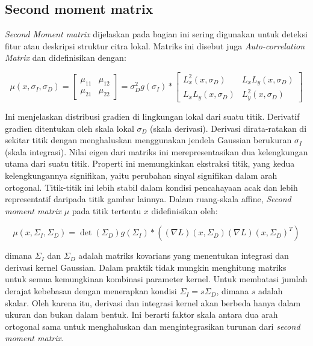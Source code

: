 \subsection{\textbf{Second moment matrix}}

\emph{Second Moment matrix} dijelaskan pada bagian ini sering digunakan untuk deteksi 
fitur atau deskripsi struktur citra lokal. Matriks ini disebut juga \emph{Auto-correlation Matrix} 
dan didefinisikan dengan:

\begin{equation}
  \mu(x,\sigma_{I},\sigma_{D})= 
  \begin{bmatrix}
   \mu_{11} & \mu_{12} \\
   \mu_{21} & \mu_{22} 
   \end{bmatrix} =
   \sigma^{2}_{D}g(\sigma_{I}) *
   \begin{bmatrix}
   L^{2}_{x}(x,\sigma_{D}) & L_{x}L_{y}(x,\sigma_{D}) \\
   L_{x}L_{y}(x,\sigma_{D}) & L^{2}_{y}(x,\sigma_{D}) 
   \end{bmatrix}
\end{equation}

Ini menjelaskan distribusi gradien di lingkungan lokal dari suatu titik. Derivatif gradien ditentukan 
oleh skala lokal \(\sigma_{D}\) (skala derivasi). Derivasi dirata-ratakan di sekitar titik dengan 
menghaluskan menggunakan jendela Gaussian berukuran \(\sigma_{I}\) (skala integrasi).
Nilai eigen dari matriks ini merepresentasikan dua kelengkungan utama dari suatu titik. 
Properti ini memungkinkan ekstraksi titik, yang kedua kelengkungannya signifikan, yaitu perubahan 
sinyal signifikan dalam arah ortogonal. Titik-titik ini lebih stabil dalam kondisi pencahayaan acak 
dan lebih representatif daripada titik gambar lainnya.
Dalam ruang-skala affine, \emph{Second moment matrix} \(\mu\) pada titik tertentu \(x\) didefinisikan oleh:

\begin{equation*}
  \mu(x, \Sigma_{I}, \Sigma_{D} ) = \det(\Sigma_{D})g(\Sigma_{I})* ((\nabla L)(x, \Sigma_{D})(\nabla L)(x, \Sigma_{D})^{T})
\end{equation*}

dimana \(\Sigma_{I}\) dan \(\Sigma_{D}\) adalah matriks kovarians yang menentukan integrasi dan 
derivasi kernel Gaussian. Dalam praktik tidak mungkin menghitung matriks untuk semua kemungkinan 
kombinasi parameter kernel. Untuk membatasi jumlah derajat kebebasan dengan menerapkan 
kondisi \(\Sigma_{I} = s\Sigma_{D}\), dimana \(s\) adalah skalar. Oleh karena itu, derivasi dan integrasi 
kernel akan berbeda hanya dalam ukuran dan bukan dalam bentuk. Ini berarti faktor skala antara dua arah ortogonal 
sama untuk menghaluskan dan mengintegrasikan turunan dari \emph{second moment matrix}.

